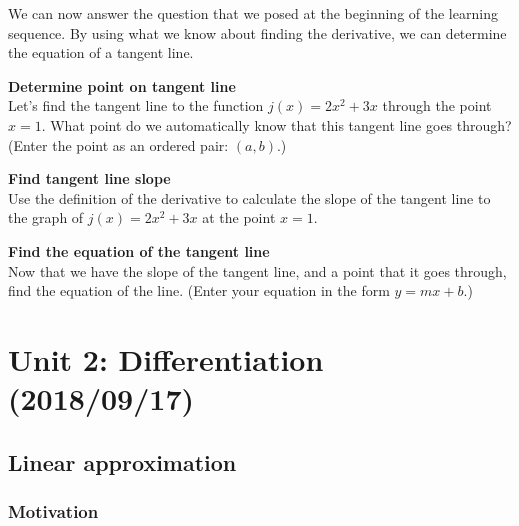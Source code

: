 \documentclass[pdftex, brazil, 12pt, twoside]{article}
\begin{document}
We can now answer the question that we posed at the beginning of the learning
sequence. By using what we know about finding the derivative, we can determine
the equation of a tangent line.

\begin{exercise}
  \textbf{Determine point on tangent line}\\%
  Let's find the tangent line to the function $j(x) = 2x^2 + 3x$ through the point
  $x=1$. What point do we automatically know that this tangent line goes through?
  (Enter the point as an ordered pair: $(a, b)$.)
\end{exercise}

\begin{exercise}
  \textbf{Find tangent line slope}\\%
  Use the definition of the derivative to calculate the slope of the tangent line
  to the graph of $j(x) = 2x^2 + 3x$ at the point $x=1$.
\end{exercise}

\begin{exercise}
  \textbf{Find the equation of the tangent line}\\%
  Now that we have the slope of the tangent line, and a point that it goes through,
  find the equation of the line. (Enter your equation in the form
  $y = mx + b$.)
\end{exercise}




\newpage
\section{Unit 2: Differentiation (2018/09/17)}
\label{u2}


\subsection{Linear approximation}
\label{u2-linear-approx}

\subsubsection{Motivation}
\label{u2-linear-approx-motiv}
\end{document}
